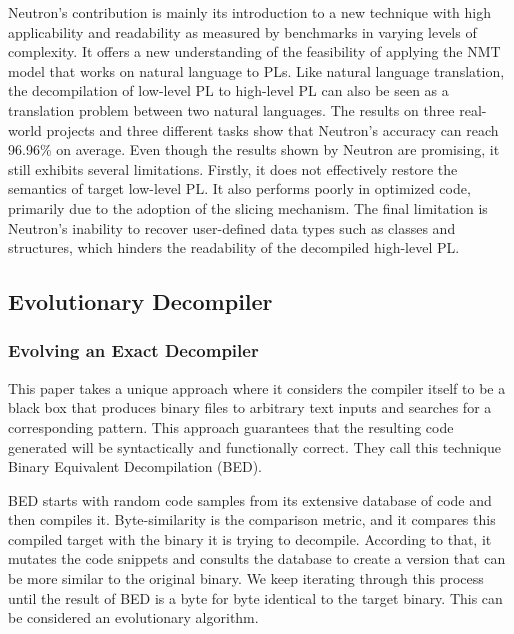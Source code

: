 \documentclass[conference,a4paper]{IEEEtran}
\begin{document}
Neutron’s contribution is mainly its introduction to a new technique with high applicability and readability as measured by benchmarks in varying levels of complexity. It offers a new understanding of the feasibility of applying the NMT model that works on natural language to PLs.
Like natural language translation, the decompilation of low-level PL to high-level PL can also be seen as a translation problem between two natural languages.
The results on three real-world projects and three different tasks show that Neutron’s accuracy can reach 96.96\% on average.
Even though the results shown by Neutron are promising, it still exhibits several limitations. Firstly, it does not effectively restore the semantics of target low-level PL. It also performs poorly in optimized code, primarily due to the adoption of the slicing mechanism.
The final limitation is Neutron’s inability to recover user-defined data types such as classes and structures, which hinders the readability of the decompiled high-level PL.
 \cite{liang_neutron_2021}

\subsection{Evolutionary Decompiler}

\subsubsection{Evolving an Exact Decompiler}

This paper\cite{schulte_evolving_2018} takes a unique approach where it considers the compiler itself to be a black box that produces binary files to arbitrary text inputs and searches for a corresponding pattern.
This approach guarantees that the resulting code generated will be syntactically and functionally correct.
They call this technique Binary Equivalent Decompilation (BED).

BED starts with random code samples from its extensive database of code and then compiles it.
Byte-similarity is the comparison metric, and it compares this compiled target with the binary it is trying to decompile.
According to that, it mutates the code snippets and consults the database to create a version that can be more similar to the original binary.
We keep iterating through this process until the result of BED is a byte for byte identical to the target binary.
This can be considered an evolutionary algorithm.
\end{document}
